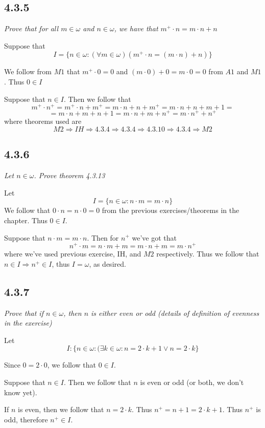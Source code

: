 \documentclass[11pt,oneside,titlepage]{book}
\DeclareMathOperator \ra {\Rightarrow}
\begin{document}
\subsection*{4.3.5}

\textit{Prove that for all $m \in \omega$ and $n \in \omega$, we have that
  $m^+ \cdot n  = m \cdot n + n$}

Suppose that
$$I = \{n \in \omega: (\forall m \in \omega)(m^+ \cdot n  = (m \cdot n) + n)\}$$

We follow from $M1$ that $m^+ \cdot 0 = 0$  and $(m \cdot 0) + 0 = m \cdot 0 = 0$
from $A1$ and $M1$. Thus $0 \in I$

Suppose that $n \in I$. Then we follow that
$$m^+ \cdot n^+ = m^+ \cdot n + m^+ = m \cdot n + n + m^+ = m \cdot n + n + m + 1 = $$
$$= m \cdot n + m + n + 1  = m \cdot n + m + n^+ = m \cdot n^+ + n^+$$
where theorems used are
$$M2 \ra IH \ra 4.3.4 \ra 4.3.4 \ra  4.3.10 \ra 4.3.4 \ra M2$$

\subsection*{4.3.6}

\textit{Let $n \in \omega$. Prove theorem 4.3.13}

Let
$$I = \{n \in \omega: n \cdot m = m \cdot n\}$$
We follow that $0 \cdot n = n \cdot 0 = 0$ from the previous exercises/theorems in the
chapter. Thus $0 \in I$.

Suppose that $n \cdot m = m \cdot n$. Then for $n^+$ we've got that
$$n^+ \cdot m = n \cdot m + m = m \cdot n + m = m \cdot n^+$$
where we've used previous exercise, IH, and $M2$ respectively. Thus we follow that
$n \in I \ra n^+ \in I$, thus $I = \omega$, as desired.

\subsection*{4.3.7}

\textit{Prove that if $n \in \omega$, then $n$ is either even or odd (details of definition
  of evenness in the exercise)}

Let
$$I: \{n \in \omega: (\exists k \in \omega: n = 2 \cdot k + 1 \lor n = 2 \cdot k\}$$

Since $0 = 2 \cdot 0$, we follow that $0 \in I$.

Suppose that $n \in I$. Then we follow that $n$ is even or odd (or both, we don't know yet).

If $n$ is even, then we follow that $n = 2 \cdot k$. Thus $n^+ = n + 1 = 2 \cdot k + 1$. Thus
$n^+$ is odd, therefore $n^+ \in I$.
\end{document}

